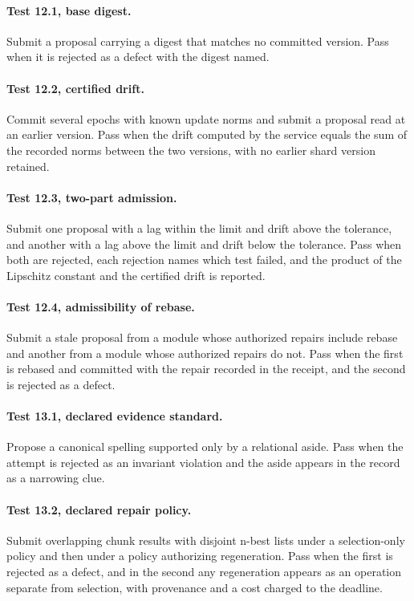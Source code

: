 \documentclass[11pt,openany]{book}
\theoremstyle{remark}
\begin{document}
\paragraph{Test 12.1, base digest.} Submit a proposal carrying a digest that matches no committed version. Pass when it is rejected as a defect with the digest named.

\paragraph{Test 12.2, certified drift.} Commit several epochs with known update norms and submit a proposal read at an earlier version. Pass when the drift computed by the service equals the sum of the recorded norms between the two versions, with no earlier shard version retained.

\paragraph{Test 12.3, two-part admission.} Submit one proposal with a lag within the limit and drift above the tolerance, and another with a lag above the limit and drift below the tolerance. Pass when both are rejected, each rejection names which test failed, and the product of the Lipschitz constant and the certified drift is reported.

\paragraph{Test 12.4, admissibility of rebase.} Submit a stale proposal from a module whose authorized repairs include rebase and another from a module whose authorized repairs do not. Pass when the first is rebased and committed with the repair recorded in the receipt, and the second is rejected as a defect.

\paragraph{Test 13.1, declared evidence standard.} Propose a canonical spelling supported only by a relational aside. Pass when the attempt is rejected as an invariant violation and the aside appears in the record as a narrowing clue.

\paragraph{Test 13.2, declared repair policy.} Submit overlapping chunk results with disjoint n-best lists under a selection-only policy and then under a policy authorizing regeneration. Pass when the first is rejected as a defect, and in the second any regeneration appears as an operation separate from selection, with provenance and a cost charged to the deadline.
\end{document}
